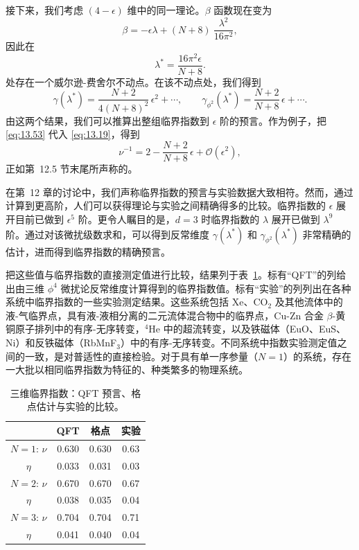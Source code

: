 接下来，我们考虑 $(4-\epsilon)$ 维中的同一理论。$\beta$ 函数现在变为
\begin{equation}
  \beta = -\epsilon\lambda + (N+8)\ \frac{\lambda^2}{16\pi^2} ,
  \label{eq:13.51}
\end{equation}
因此在
\begin{equation}
  \lambda^{*} = \frac{16\pi^2\epsilon}{N+8} .
  \label{eq:13.52}
\end{equation}
处存在一个威尔逊-费舍尔不动点。在该不动点处，我们得到
\begin{equation}
  \gamma(\lambda^{*}) = \frac{N+2}{4(N+8)^2}\,\epsilon^2 + \cdots,\qquad
  \gamma_{\phi^2}(\lambda^{*}) = \frac{N+2}{N+8}\,\epsilon + \cdots .
  \label{eq:13.53}
\end{equation}
由这两个结果，我们可以推算出整组临界指数到 $\epsilon$ 阶的预言。作为例子，把 \eqref{eq:13.53} 代入 \eqref{eq:13.19}，得到
\begin{equation}
  \nu^{-1} = 2 - \frac{N+2}{N+8}\,\epsilon + \mathcal{O}(\epsilon^2) ,
  \label{eq:13.54}
\end{equation}
正如第~12.5 节末尾所声称的。

在第~12 章的讨论中，我们声称临界指数的预言与实验数据大致相符。然而，通过计算到更高阶，人们可以获得理论与实验之间精确得多的比较。临界指数的 $\epsilon$ 展开目前已做到 $\epsilon^5$ 阶。更令人瞩目的是，$d = 3$ 时临界指数的 $\lambda$ 展开已做到 $\lambda^9$ 阶。通过对该微扰级数求和，可以得到反常维度 $\gamma(\lambda^{*})$ 和 $\gamma_{\phi^2}(\lambda^{*})$ 非常精确的估计，进而得到临界指数的精确预言。

把这些值与临界指数的直接测定值进行比较，结果列于表~\ref{tab:13.1}。标有``QFT''的列给出由三维 $\phi^4$ 微扰论反常维度计算得到的临界指数值。标有``实验''的列列出在各种系统中临界指数的一些实验测定结果。这些系统包括 Xe、CO$_2$ 及其他流体中的液-气临界点，具有液-液相分离的二元流体混合物中的临界点，Cu-Zn 合金 $\beta$-黄铜原子排列中的有序-无序转变，$^4$He 中的超流转变，以及铁磁体（EuO、EuS、Ni）和反铁磁体（RbMnF$_3$）中的有序-无序转变。不同系统中指数实验测定值之间的一致，是对普适性的直接检验。对于具有单一序参量（$N = 1$）的系统，存在一大批以相同临界指数为特征的、种类繁多的物理系统。

\begin{table}[t]
  \centering
  \caption{三维临界指数：QFT 预言、格点估计与实验的比较。}
  \begin{tabular}{cccc}
    \toprule
    & QFT & 格点 & 实验\\
    \midrule
    $N=1$: $\nu$ & 0.630 & 0.630 & 0.63\\
    \quad $\eta$ & 0.033 & 0.031 & 0.03\\
    $N=2$: $\nu$ & 0.670 & 0.670 & 0.67\\
    \quad $\eta$ & 0.038 & 0.035 & 0.04\\
    $N=3$: $\nu$ & 0.704 & 0.704 & 0.71\\
    \quad $\eta$ & 0.041 & 0.040 & 0.04\\
    \bottomrule
  \end{tabular}
  \label{tab:13.1}
\end{table}

